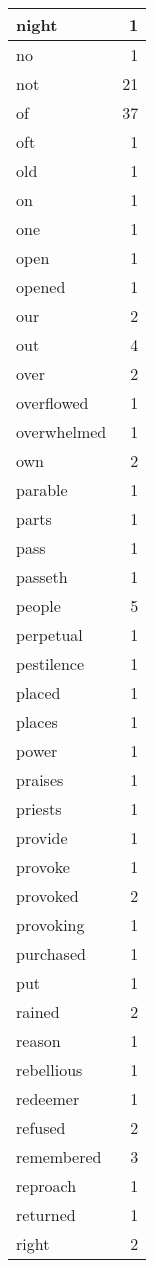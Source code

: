 \begin{center}
\begin{longtable}{l|r}
night & 1\\ \hline 
no & 1\\ \hline 
not & 21\\ \hline 
of & 37\\ \hline 
oft & 1\\ \hline 
old & 1\\ \hline 
on & 1\\ \hline 
one & 1\\ \hline 
open & 1\\ \hline 
opened & 1\\ \hline 
our & 2\\ \hline 
out & 4\\ \hline 
over & 2\\ \hline 
overflowed & 1\\ \hline 
overwhelmed & 1\\ \hline 
own & 2\\ \hline 
parable & 1\\ \hline 
parts & 1\\ \hline 
pass & 1\\ \hline 
passeth & 1\\ \hline 
people & 5\\ \hline 
perpetual & 1\\ \hline 
pestilence & 1\\ \hline 
placed & 1\\ \hline 
places & 1\\ \hline 
power & 1\\ \hline 
praises & 1\\ \hline 
priests & 1\\ \hline 
provide & 1\\ \hline 
provoke & 1\\ \hline 
provoked & 2\\ \hline 
provoking & 1\\ \hline 
purchased & 1\\ \hline 
put & 1\\ \hline 
rained & 2\\ \hline 
reason & 1\\ \hline 
rebellious & 1\\ \hline 
redeemer & 1\\ \hline 
refused & 2\\ \hline 
remembered & 3\\ \hline 
reproach & 1\\ \hline 
returned & 1\\ \hline 
right & 2\\ \hline 

\end{longtable}
\end{center}
